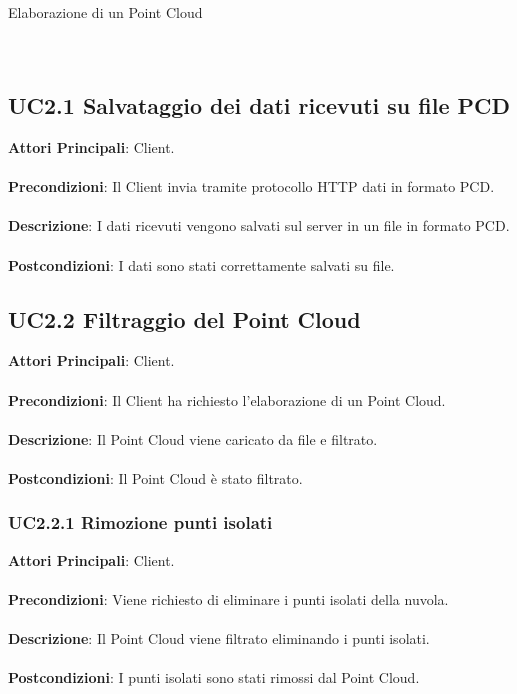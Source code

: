 \begin{usecase}{2}{Elaborazione di un Point Cloud}
\\ 
\\ 
\\ 
\label{uc:elaborazione}
\end{usecase}

\subsection{UC2.1 Salvataggio dei dati ricevuti su file PCD}
\textbf{Attori Principali}: Client.
\\\\ \textbf{Precondizioni}: Il Client invia tramite protocollo HTTP dati in formato PCD.
\\\\ \textbf{Descrizione}: I dati ricevuti vengono salvati sul server in un file in formato PCD.
\\\\ \textbf{Postcondizioni}: I dati sono stati correttamente salvati su file.

\subsection{UC2.2 Filtraggio del Point Cloud}
\textbf{Attori Principali}: Client.
\\\\ \textbf{Precondizioni}: Il Client ha richiesto l'elaborazione di un Point Cloud.
\\\\ \textbf{Descrizione}: Il Point Cloud viene caricato da file e filtrato.
\\\\ \textbf{Postcondizioni}: Il Point Cloud è stato filtrato.

\subsubsection{UC2.2.1 Rimozione punti isolati}
\textbf{Attori Principali}: Client.
\\\\ \textbf{Precondizioni}: Viene richiesto di eliminare i punti isolati della nuvola.
\\\\ \textbf{Descrizione}: Il Point Cloud viene filtrato eliminando i punti isolati.
\\\\ \textbf{Postcondizioni}: I punti isolati sono stati rimossi dal Point Cloud.

